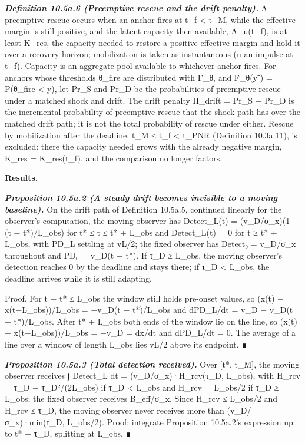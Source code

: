 \documentclass[
]{article}
\begin{document}
\emph{\textbf{Definition 10.5a.6 (Preemptive rescue and the drift
penalty).}} A preemptive rescue occurs when an anchor fires at t\_f
\textless{} t\_M, while the effective margin is still positive, and the
latent capacity then available, A\_u(t\_f), is at least K\_res, the
capacity needed to restore a positive effective margin and hold it over
a recovery horizon; mobilization is taken as instantaneous (u an impulse
at t\_f). Capacity is an aggregate pool available to whichever anchor
fires. For anchors whose thresholds θ\_fire are distributed with F\_θ,
and F\_θ(y⁻) = P(θ\_fire \textless{} y), let Pr\_S and Pr\_D be the
probabilities of preemptive rescue under a matched shock and drift. The
drift penalty Π\_drift = Pr\_S − Pr\_D is the incremental probability of
preemptive rescue that the shock path has over the matched drift path;
it is not the total probability of rescue under either. Rescue by
mobilization after the deadline, t\_M ≤ t\_f \textless{} t\_PNR
(Definition 10.3a.11), is excluded: there the capacity needed grows with
the already negative margin, K\_res = K\_res(t\_f), and the comparison
no longer factors.

\textbf{Results.}

\emph{\textbf{Proposition 10.5a.2 (A steady drift becomes invisible to a
moving baseline).}} On the drift path of Definition 10.5a.5, continued
linearly for the observer's computation, the moving observer has
Detect\_L(t) = (v\_D/σ\_x)(1 − (t − t*)/L\_obs) for t* ≤ t ≤ t* + L\_obs
and Detect\_L(t) = 0 for t ≥ t* + L\_obs, with PD\_L settling at vL/2;
the fixed observer has Detect₀ = v\_D/σ\_x throughout and PD₀ = v\_D(t −
t*). If τ\_D ≥ L\_obs, the moving observer's detection reaches 0 by the
deadline and stays there; if τ\_D \textless{} L\_obs, the deadline
arrives while it is still adapting.

Proof. For t − t* ≤ L\_obs the window still holds pre-onset values, so
(x(t) − x(t−L\_obs))/L\_obs = −v\_D(t − t*)/L\_obs and dPD\_L/dt = v\_D
− v\_D(t − t*)/L\_obs. After t* + L\_obs both ends of the window lie on
the line, so (x(t) − x(t−L\_obs))/L\_obs = −v\_D = dx/dt and dPD\_L/dt =
0. The average of a line over a window of length L\_obs lies vL/2 above
its endpoint. ∎

\emph{\textbf{Proposition 10.5a.3 (Total detection received).}} Over
{[}t*, t\_M{]}, the moving observer receives ∫ Detect\_L dt =
(v\_D/σ\_x)·H\_rcv(τ\_D, L\_obs), with H\_rcv = τ\_D − τ\_D²/(2L\_obs)
if τ\_D \textless{} L\_obs and H\_rcv = L\_obs/2 if τ\_D ≥ L\_obs; the
fixed observer receives B\_eff/σ\_x. Since H\_rcv ≤ L\_obs/2 and H\_rcv
≤ τ\_D, the moving observer never receives more than
(v\_D/σ\_x)·min(τ\_D, L\_obs/2). Proof: integrate Proposition 10.5a.2's
expression up to t* + τ\_D, splitting at L\_obs. ∎
\end{document}
